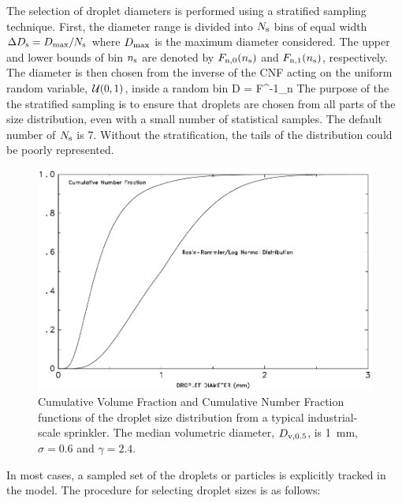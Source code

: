 The selection of droplet diameters is performed using a stratified sampling technique. First, the diameter range is divided
into $N_{\rm s}$ bins of equal width $\Delta D_{\rm s}= D_{\rm max}/N_{\rm s}$ where $D_{\rm max}$ is the maximum diameter considered.
The upper and lower bounds of bin $n_{\rm s}$ are denoted by $F_{\rm n,0}(n_{\rm s})$ and $F_{\rm n,1}(n_{\rm s})$, respectively.
The diameter is then chosen from the inverse of the CNF acting on the uniform random variable, ${\cal U}(0,1)$, inside a random bin
\be
   D = F^{-1}_{\rm n}  \label{Ud_strat}
\ee
The purpose of the the stratified sampling is to ensure that droplets are chosen from all parts of the size distribution, even with a small number of statistical samples. The default number of $N_{\rm s}$ is 7. Without the stratification, the tails of the distribution could be poorly represented.
\begin{figure}[t]
\begin{center}
\includegraphics[width=4.5in]{FIGURES/rosin}
\caption[Liquid droplet size distribution]{Cumulative Volume Fraction and Cumulative Number
Fraction functions of the droplet size distribution from
a typical industrial-scale sprinkler. The median volumetric diameter, $D_{\rm v,0.5}$, is
1~mm, $\sigma=0.6$ and $\gamma=2.4$.}
\label{rosin}
\end{center}
\end{figure}
In most cases, a sampled set of the droplets or particles is explicitly tracked in the model. The procedure for selecting droplet sizes is as follows:
